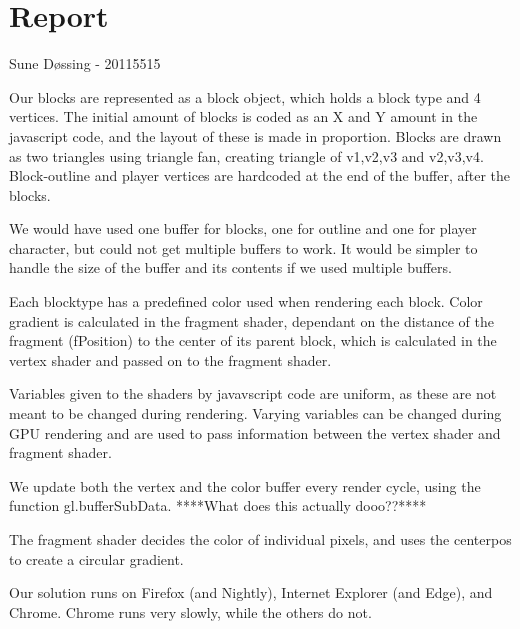 \section{Report}

Sune Døssing - 20115515



Our blocks are represented as a block object, which holds a block type and 4 vertices.
The initial amount of blocks is coded as an X and Y amount in the javascript code,
and the layout of these is made in proportion.
Blocks are drawn as two triangles using triangle fan, creating triangle of v1,v2,v3 and v2,v3,v4.
Block-outline and player vertices are hardcoded at the end of the buffer, after the blocks.

We would have used one buffer for blocks, 
one for outline and one for player character, 
but could not get multiple buffers to work.
It would be simpler to handle the size of the buffer and its contents if we used multiple buffers.


Each blocktype has a predefined color used when rendering each block.
Color gradient is calculated in the fragment shader, 
dependant on the distance of the fragment (fPosition) to the center of its parent block,
which is calculated in the vertex shader and passed on to the fragment shader.


Variables given to the shaders by javavscript code are uniform, 
as these are not meant to be changed during rendering.
Varying variables can be changed during GPU rendering and are 
used to pass information between the vertex shader and fragment shader.


We update both the vertex and the color buffer every render cycle, 
using the function gl.bufferSubData. ****What does this actually dooo??****



The fragment shader decides the color of individual pixels, 
and uses the centerpos to create a circular gradient.


Our solution runs on Firefox (and Nightly), Internet Explorer (and Edge), and Chrome.
Chrome runs very slowly, while the others do not.